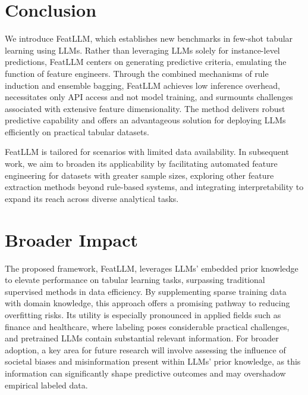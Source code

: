 \section{Conclusion}
We introduce \textsf{FeatLLM}, which establishes new benchmarks in few-shot tabular learning using LLMs. Rather than leveraging LLMs solely for instance-level predictions, \textsf{FeatLLM} centers on generating predictive criteria, emulating the function of feature engineers. Through the combined mechanisms of rule induction and ensemble bagging, \textsf{FeatLLM} achieves low inference overhead, necessitates only API access and not model training, and surmounts challenges associated with extensive feature dimensionality. The method delivers robust predictive capability and offers an advantageous solution for deploying LLMs efficiently on practical tabular datasets.

\textsf{FeatLLM} is tailored for scenarios with limited data availability. In subsequent work, we aim to broaden its applicability by facilitating automated feature engineering for datasets with greater sample sizes, exploring other feature extraction methods beyond rule-based systems, and integrating interpretability to expand its reach across diverse analytical tasks.

\section{Broader Impact} The proposed framework, \textsf{FeatLLM}, leverages LLMs’ embedded prior knowledge to elevate performance on tabular learning tasks, surpassing traditional supervised methods in data efficiency. By supplementing sparse training data with domain knowledge, this approach offers a promising pathway to reducing overfitting risks. Its utility is especially pronounced in applied fields such as finance and healthcare, where labeling poses considerable practical challenges, and pretrained LLMs contain substantial relevant information. For broader adoption, a key area for future research will involve assessing the influence of societal biases and misinformation present within LLMs’ prior knowledge, as this information can significantly shape predictive outcomes and may overshadow empirical labeled data.

